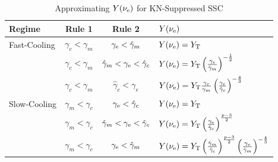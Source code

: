 \documentclass[fleqn,usenatbib]{mnras}
\begin{document}
\begin{table}
\caption{Approximating $Y(\nu_{\rm e})$ for KN-Suppressed SSC}
\label{tab:YKN}
\begin{tabular}{lccl}
\hline
Regime&Rule 1 & Rule 2 & $Y(\nu_{\rm e})$\\
\hline
Fast-Cooling &$ \gamma_{c} < \gamma_{m} $&$ \gamma_{\rm e} < \hat{\gamma}_{m} $&$ Y(\nu_{\rm e}) = Y_{\rm T}$\\
 &$ \gamma_{c} < \gamma_{m} $&$\hat{\gamma}_{m} < \gamma_{\rm e} < \hat{\gamma}_{c}$ & $Y(\nu_{\rm e}) = Y_{\rm T} \left(\frac{\gamma_{e}}{\hat{\gamma}_{m}}\right)^{-\frac{1}{2}}$\\
  & $\gamma_{c} < \gamma_{m}$ & $\hat{\gamma}_{c} < \gamma_{e}$ &$ Y (\nu_{\rm e}) = Y_{\rm T}\frac{\gamma_{c}}{\gamma_{m}}\left(\frac{\gamma_{e}}{\hat{\gamma}_{c}}\right)^{-\frac{4}{3}}$ \\
  Slow-Cooling & $\gamma_{m} < \gamma_{c}$ & $\gamma_{\rm e} < \hat{\gamma}_{c}$ & $Y(\nu_{\rm e}) = Y_{\rm T}$ \\
  & $\gamma_{m} < \gamma_{c}$ &$\hat{\gamma}_{m} < \gamma_{\rm e} < \hat{\gamma}_{c}$ & $Y(\nu_{\rm e})=Y_{\rm T}\left(\frac{\gamma_{\rm e}}{\hat{\gamma}_{\rm c}}\right)^{\frac{p-3}{2}}$ \\
   & $\gamma_{m} < \gamma_{c}$ &$\gamma_{\rm e} < \hat{\gamma}_{m}$ &  $Y(\nu_{\rm e}) = Y_{\rm T}\left(\frac{\hat{\gamma}_{m}}{\hat{\gamma}_{\rm c}}\right)^{\frac{p-3}{2}}\left(\frac{\gamma_{e}}{\hat{\gamma}_{m}}\right)^{-\frac{4}{3}}$\\
   \hline
\end{tabular}
\end{table}
\end{document}
